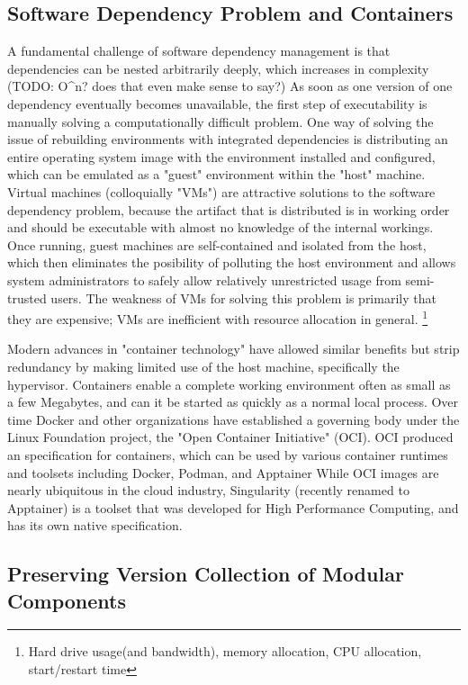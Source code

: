\subsection{Software Dependency Problem and Containers}

A fundamental challenge of software dependency management is that dependencies can be nested arbitrarily deeply, which increases in complexity (TODO: O^n? does that even make sense to say?)
As soon as one version of one dependency eventually becomes unavailable, the first step of executability is manually solving a computationally difficult problem.
One way of solving the issue of rebuilding environments with integrated dependencies is distributing an entire operating system image with the environment installed and configured, which can be emulated as a "guest" environment within the "host" machine.
Virtual machines (colloquially "VMs") are attractive solutions to the software dependency problem, because the artifact that is distributed is in working order and should be executable with almost no knowledge of the internal workings.
Once running, guest machines are self-contained and isolated from the host, which then eliminates the posibility of polluting the host environment and allows system administrators to safely allow relatively unrestricted usage from semi-trusted users.
The weakness of VMs for solving this problem is primarily that they are expensive; VMs are inefficient with resource allocation in general. \cite{TODO: asmacdo} \footnote{Hard drive usage(and bandwidth), memory allocation, CPU allocation, start/restart time}

Modern advances in "container technology" have allowed similar benefits but strip redundancy by making limited use of the host machine, specifically the hypervisor.
Containers enable a complete working environment often as small as a few Megabytes, and can it be started as quickly as a normal local process.
Over time Docker and other organizations have established a governing body under the Linux Foundation project, the "Open Container Initiative" (OCI).
OCI produced an specification for containers, which can be used by various container runtimes and toolsets including Docker, Podman, and Apptainer \cite{TODO: apptainer something}
While OCI images are nearly ubiquitous in the cloud industry, Singularity (recently renamed to Apptainer) is a toolset that was developed for High Performance Computing, and has its own native specification.

\subsection{Preserving Version Collection of Modular Components}

